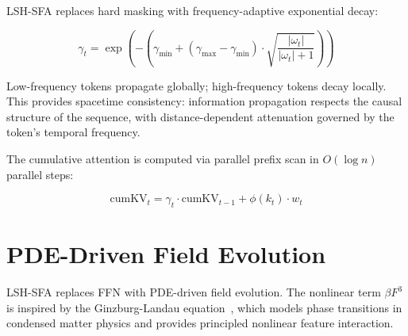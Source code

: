 \documentclass{article}
\begin{document}
LSH-SFA replaces hard masking with frequency-adaptive exponential decay:

\begin{equation}
\gamma_t = \exp\!\left(-\left(\gamma_{\min} + (\gamma_{\max} - \gamma_{\min}) \cdot \sqrt{\frac{|\omega_t|}{|\omega_t| + 1}}\right)\right)
\end{equation}

Low-frequency tokens propagate globally; high-frequency tokens decay locally. This provides spacetime consistency: information propagation respects the causal structure of the sequence, with distance-dependent attenuation governed by the token's temporal frequency.

The cumulative attention is computed via parallel prefix scan in $O(\log n)$ parallel steps:

\begin{equation}
\text{cumKV}_t = \gamma_t \cdot \text{cumKV}_{t-1} + \phi(k_t) \cdot w_t
\end{equation}

\section{PDE-Driven Field Evolution}

LSH-SFA replaces FFN with PDE-driven field evolution. The nonlinear term $\beta F^3$ is inspired by the Ginzburg-Landau equation~\citep{ginzburg1950k}, which models phase transitions in condensed matter physics and provides principled nonlinear feature interaction.
\end{document}
